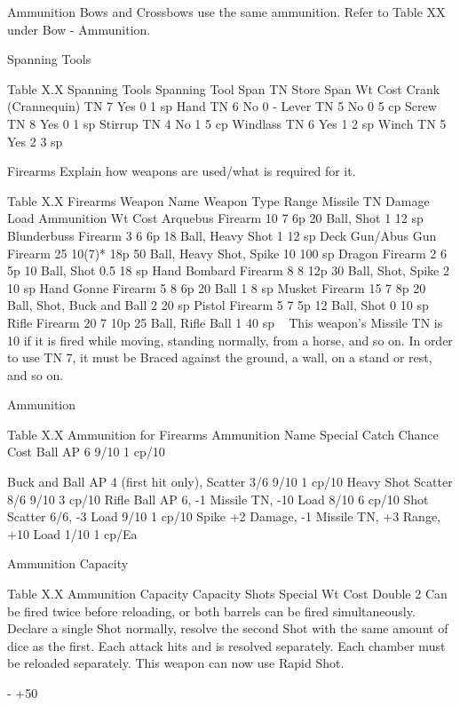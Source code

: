 \documentclass[oneside,11pt,english]{book}
\begin{document}
 

Ammunition 
Bows and Crossbows use the same ammunition. Refer to Table XX under Bow - Ammunition. 

 


Spanning Tools 

 
Table X.X Spanning Tools 
Spanning Tool Span TN Store Span Wt Cost 
Crank (Crannequin) TN 7 Yes 0 1 sp 
Hand TN 6 No 0 - 
Lever TN 5 No 0 5 cp 
Screw TN 8 Yes 0 1 sp 
Stirrup TN 4 No 1 5 cp 
Windlass TN 6 Yes 1 2 sp 
Winch TN 5 Yes 2 3 sp 

 

Firearms 
Explain how weapons are used/what is required for it. 

 
Table X.X Firearms 
Weapon Name Weapon Type Range Missile TN Damage Load Ammunition Wt Cost 
Arquebus Firearm 10 7 6p 20 Ball, Shot 1 12 sp 
Blunderbuss Firearm 3 6 6p 18 Ball, Heavy Shot 1 12 sp 
Deck Gun/Abus Gun Firearm 25 10(7)* 18p 50 Ball, Heavy Shot, Spike 10 100 sp 
Dragon Firearm 2 6 5p 10 Ball, Shot 0.5 18 sp 
Hand Bombard Firearm 8 8 12p 30 Ball, Shot, Spike 2 10 sp 
Hand Gonne Firearm 5 8 6p 20 Ball 1 8 sp 
Musket Firearm 15 7 8p 20 Ball, Shot, Buck and Ball 2 20 sp 
Pistol Firearm 5 7 5p 12 Ball, Shot 0 10 sp 
Rifle Firearm 20 7 10p 25 Ball, Rifle Ball 1 40 sp 
~ This weapon’s Missile TN is 10 if it is fired while moving, standing normally, from a horse, and so on. In order to use TN 7, it 
must be Braced against the ground, a wall, on a stand or rest, and so on. 

 

Ammunition 

 
Table X.X Ammunition for Firearms 
Ammunition Name Special Catch Chance Cost 
Ball AP 6 9/10 1 cp/10 


Buck and Ball AP 4 (first hit only), Scatter 3/6 9/10 1 cp/10 
Heavy Shot Scatter 8/6 9/10 3 cp/10 
Rifle Ball AP 6, -1 Missile TN, -10 Load 8/10 6 cp/10 
Shot Scatter 6/6, -3 Load 9/10 1 cp/10 
Spike +2 Damage, -1 Missile TN, +3 Range, +10 Load 1/10 1 cp/Ea 

 
Ammunition Capacity 

 
Table X.X Ammunition Capacity 
Capacity Shots Special Wt Cost 
Double 2 Can be fired twice before reloading, or both barrels can be fired simultaneously. 
Declare a single Shot normally, resolve the second Shot with the same amount of 
dice as the first. Each attack hits and is resolved separately. Each chamber must be 
reloaded separately. 
This weapon can now use Rapid Shot. 

- +50%
\end{document}
